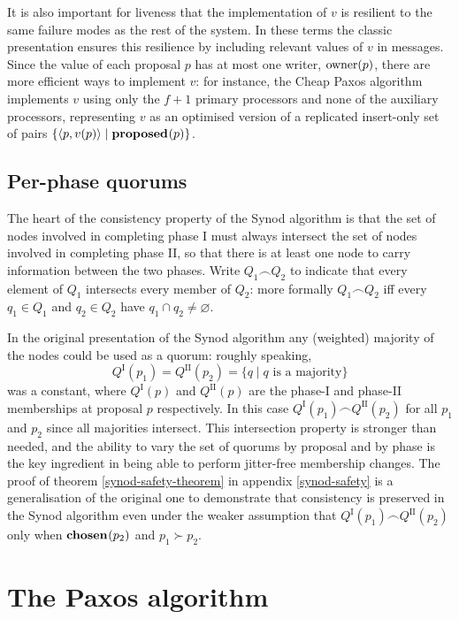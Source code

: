 \documentclass[journal]{IEEEtran}
\begin{document}
It is also important for liveness that the implementation of $v$ is resilient
to the same failure modes as the rest of the system. In these terms the classic
presentation ensures this resilience by including relevant values of $v$ in
messages. Since the value of each proposal $p$ has at most one writer,
$\mathrm{owner}(p)$, there are more efficient ways to implement $v$: for instance, the
Cheap Paxos algorithm implements $v$ using only the $f+1$ primary processors
and none of the auxiliary processors, representing $v$ as an optimised version
of a replicated insert-only set \cite{crdts} of pairs $\{ \langle p, v(p)
\rangle \mid \mathbf{proposed}_{}(p) \}$.

\subsection{Per-phase quorums}\label{per-phase-quorums}

The heart of the consistency property of the Synod algorithm is that the set of
nodes involved in completing phase I must always intersect the set of nodes
involved in completing phase II, so that there is at least one node to carry
information between the two phases. Write $Q_1 \frown Q_2$ to indicate that
every element of $Q_1$ intersects every member of $Q_2$: more formally $Q_1
\frown Q_2$ iff every $q_1 \in Q_1$ and $q_2 \in Q_2$ have ${q_1 \cap q_2 \ne
\varnothing}$.

In the original presentation of the Synod algorithm any (weighted) majority of
the nodes could be used as a quorum: roughly speaking, \[Q^\textrm{I}(p_1) =
Q^\textrm{II}(p_2) = \{ q \mid q \text{ is a majority}\}\] was a constant,
where $Q^\textrm{I}(p)$ and $Q^\textrm{II}(p)$ are the phase-I and phase-II
memberships at proposal $p$ respectively.  In this case $Q^\textrm{I}(p_1)
\frown Q^\textrm{II}(p_2)$ for all $p_1$ and $p_2$ since all majorities
intersect.  This intersection property is stronger than needed, and the ability
to vary the set of quorums by proposal and by phase is the key ingredient in
being able to perform jitter-free membership changes. The proof of theorem
\ref{synod-safety-theorem} in appendix \ref{synod-safety} is a generalisation
of the original one to demonstrate that consistency is preserved in the Synod
algorithm even under the weaker assumption that $Q^\textrm{I}(p_1) \frown
Q^\textrm{II}(p_2)$ only when $\mathbf{chosen}_{}(p_2)$ and $p_1 \succ p_2$.

\section{The Paxos algorithm}
\end{document}
